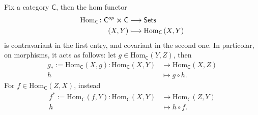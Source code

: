 \documentclass[../Main]{subfiles}
\begin{document}
\begin{rem}
	Fix a category $\mathsf{C}$, then the hom functor
	\begin{align}
		\mathrm{Hom}_{\mathsf{C}} \colon \mathsf{C}^{op} \cross \mathsf{C} &\longrightarrow \mathsf{Sets} \\
		\left(X, Y\right) &\longmapsto \mathrm{Hom}_{\mathsf{C}} \left( X, Y \right) \nonumber \\
	\end{align} 
	is contravariant in the first entry, and covariant in the second one.
	In particolar, on morphisms, it acts as follows:
	let $g \in \mathrm{Hom}_{\mathsf{C}} \left( Y, Z \right)$, then
	\begin{align}
		g_* := \mathrm{Hom}_{\mathsf{C}} \left( X, g \right) \colon 
		\mathrm{Hom}_{\mathsf{C}} \left( X, Y \right) 
		&\longrightarrow \mathrm{Hom}_{\mathsf{C}} \left( X, Z \right) \\
		h &\longmapsto g \circ h \nonumber
	.\end{align} 
	For $f \in \mathrm{Hom}_{\mathsf{C}} \left( Z, X \right)$, instead
	\begin{align}
		f^* := \mathrm{Hom}_{\mathsf{C}} \left( f, Y \right) \colon 
		\mathrm{Hom}_{\mathsf{C}} \left( X, Y \right) 
		&\longrightarrow \mathrm{Hom}_{\mathsf{C}} \left( Z, Y \right) \\
		h &\longmapsto h \circ f \nonumber
	.\end{align} 
\end{rem}
\end{document}
